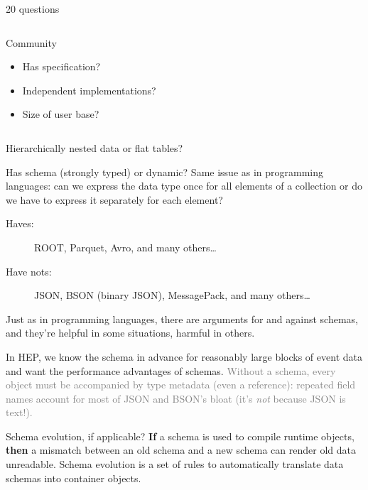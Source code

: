\documentclass[aspectratio=169]{beamer}
\begin{document}
\begin{frame}{20 questions}
\begin{columns}
\vspace{-0.2 cm}

\begin{block}{Community}
\vspace{-0.2 cm}
\begin{itemize}\setlength{\itemsep}{-0.05 cm}
\item Has specification?
\item Independent implementations?
\item Size of user base?
\end{itemize}
\end{block}

\end{columns}
\end{frame}

\begin{frame}{Hierarchically nested data or flat tables?}
\vspace{0.5 cm}
\end{frame}

\begin{frame}{Has schema (strongly typed) or dynamic?}
\vspace{0.5 cm}
Same issue as in programming languages: can we express the data type once for all elements of a collection or do we have to express it separately for each element?

\vfill

\begin{description}
\item[Haves:] ROOT, Parquet, Avro, and many others\ldots
\item[Have nots:] JSON, BSON (binary JSON), MessagePack, and many others\ldots
\end{description}

\vfill

Just as in programming languages, there are arguments for and against schemas, and they're helpful in some situations, harmful in others.

\vfill

In HEP, we know the schema in advance for reasonably large blocks of event data and want the performance advantages of schemas. \textcolor{gray}{Without a schema, every object must be accompanied by type metadata (even a reference): repeated field names account for most of JSON and BSON's bloat (it's {\it not} because JSON is text!).}
\end{frame}

\begin{frame}{Schema evolution, if applicable?}
\vspace{0.5 cm}
{\bf If} a schema is used to compile runtime objects, {\bf then} a mismatch between an old schema and a new schema can render old data unreadable. Schema evolution is a set of rules to automatically translate data schemas into container objects.



\end{frame}
\end{document}
